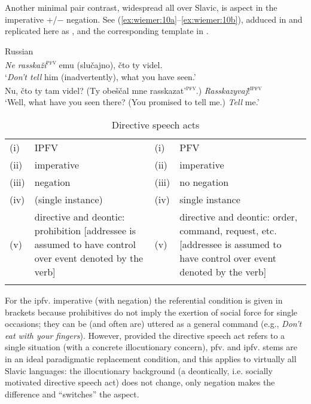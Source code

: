 \documentclass[output=paper]{langscibook}
\begin{document}
Another minimal pair contrast, widespread all over Slavic, is aspect in the imperative +/$-$ negation. See (\ref{ex:wiemer:10a}--\ref{ex:wiemer:10b}), adduced in  and replicated here as , and the corresponding template in .

\ea \label{ex:wiemer:24}
{Russian} \\ \ea 
    \textit{Ne rasskaži}\textsc{\textsuperscript{pfv}} emu (slučajno), čto ty videl.\\
    ‘\textit{Don’t tell} him (inadvertently), what you have seen.’ \label{ex:wiemer:24a} \\
    \ex \label{ex:wiemer:24b} Nu, čto ty tam videl? (Ty obeščal mne rasskazat’\textsc{\textsuperscript{pfv}}.) \textit{Rasskazyvaj}!\textsc{\textsuperscript{ipfv}}\\
    ‘Well, what have you seen there? (You promised to tell me.) \textit{Tell} me.’
\z \z 

\begin{table}
\caption{Directive speech acts}
\label{tab:wiemer:yz}
\begin{tabularx}{\textwidth}{l@{ }Ql@{ }Q}
\lsptoprule
(i)   & IPFV &              (i)   & PFV\\
(ii)  & imperative &        (ii)  & imperative\\
(iii) & negation &          (iii) & no negation\\
(iv)  & (single instance) & (iv)  & single instance\\
(v)   & directive and deontic: prohibition [addressee is assumed to have control over event denoted by the verb] & (v) & directive and deontic: order, command, request, etc. [addressee is assumed to have control over event denoted by the verb]\\
\lspbottomrule
\end{tabularx}
\end{table}

For the ipfv. imperative (with negation) the referential condition is given in brackets because prohibitives do not imply the exertion of social force for single occasions; they can be (and often are) uttered as a general command (e.g., \textit{Don’t eat with your fingers}). However, provided the directive speech act refers to a single situation (with a concrete illocutionary concern), pfv. and ipfv. stems are in an ideal paradigmatic replacement condition, and this applies to virtually all Slavic languages: the illocutionary background (a deontically, i.e. socially motivated directive speech act) does not change, only negation makes the difference and “switches” the aspect. 
\end{document}
